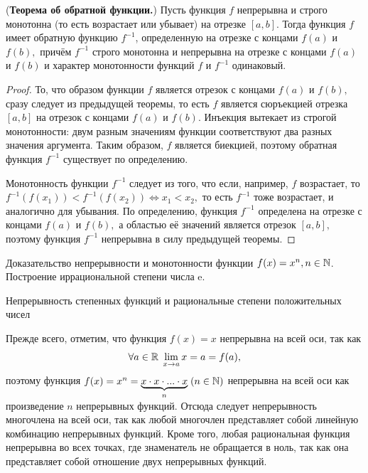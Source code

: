 \begin{theorem}(\textbf{Теорема об обратной
        функции.})
    Пусть функция $f$ непрерывна и строго монотонна
    (то есть возрастает или
    убывает) на отрезке $[a, b].$ Тогда функция $f$
    имеет обратную функцию $f^{-1}$, определенную
    на отрезке с концами $f(a)$ и $f(b),$ причём
    $f^{-1}$ строго монотонна и непрерывна на отрезке
    с концами $f(a)$ и $f(b)$ и характер
    монотонности функций $f$ и $f^{-1}$
    одинаковый.
\end{theorem}
\begin{proof}
    То, что образом функции $f$ является
    отрезок с концами $f(a)$ и $f(b),$
    сразу следует из предыдущей теоремы,
    то есть $f$ является сюръекцией
    отрезка $[a, b]$ на отрезок
    с концами $f(a)$ и $f(b).$
    Инъекция вытекает из строгой
    монотонности: двум разным значениям
    функции соответствуют два разных значения
    аргумента. Таким образом, $f$ является
    биекцией, поэтому обратная функция
    $f^{-1}$ существует по определению.

    Монотонность функции $f^{-1}$ следует из
    того, что если, например, $f$ возрастает,
    то $f^{-1}(f(x_1))<
        f^{-1}(f(x_2))\Leftrightarrow x_1<x_2,$
    то есть $f^{-1}$ тоже возрастает, и аналогично
    для убывания. По определению,
    функция $f^{-1}$ определена на отрезке
    с концами $f(a)$ и $f(b),$ а областью
    её значений является отрезок $[a, b],$
    поэтому функция $f^{-1}$ непрерывна в силу
    предыдущей теоремы.
\end{proof}
\newpage

\begin{problem}
Доказательство непрерывности и монотонности функции $f(x) = x^n, n \in \mathbb{N}$.
Построение
иррациональной степени числа e.
\end{problem}


\begin{center}
    \textsf{Непрерывность степенных функций и рациональные степени
        положительных чисел}
\end{center}

Прежде всего, отметим, что функция $f(x)=x$ непрерывна на всей оси, так как
$$
    \forall a\in\mathbb{R}\;\lim\limits_{x\rightarrow a}x=a=f(a),
$$
поэтому функция $f(x)=x^n=
    \underbrace{x \cdot x \cdot ... \cdot x}_n\; (n\in\mathbb{N})$ непрерывна на всей оси
как произведение $n$ непрерывных функций. Отсюда следует непрерывность
многочлена на всей оси, так как любой многочлен представляет собой
линейную комбинацию непрерывных функций. Кроме того, любая рациональная
функция непрерывна во всех точках, где знаменатель не обращается в ноль,
так как она представляет собой отношение двух непрерывных функций.

